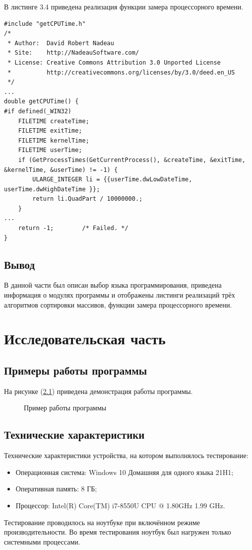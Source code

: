 \documentclass[12pt]{report}
\begin{document}
В листинге  3.4 приведена реализация функции замера процессорного времени.
\newpage
\begin{lstlisting}[label = some-code, caption = Функция замера процессорного времени]
#include "getCPUTime.h"
/*
 * Author:  David Robert Nadeau
 * Site:    http://NadeauSoftware.com/
 * License: Creative Commons Attribution 3.0 Unported License
 *          http://creativecommons.org/licenses/by/3.0/deed.en_US
 */
...
double getCPUTime() {
#if defined(_WIN32)
	FILETIME createTime;
	FILETIME exitTime;
	FILETIME kernelTime;
	FILETIME userTime;
	if (GetProcessTimes(GetCurrentProcess(), &createTime, &exitTime, &kernelTime, &userTime) != -1) {
		ULARGE_INTEGER li = {{userTime.dwLowDateTime, userTime.dwHighDateTime }};
        return li.QuadPart / 10000000.;
	}
...	
	return -1;        /* Failed. */
}
\end{lstlisting}

\section{Вывод}
В данной части был описан выбор языка программирования, приведена информация о модулях программы и отображены листинги реализаций трёх алгоритмов сортировки массивов, функции замера процессорного времени.

\chapter{Исследовательская часть}
\section{Примеры работы программы}
На рисунке (\ref{ris:example}) приведена демонстрация работы программы.

\begin{figure}[h]
\caption{Пример работы программы}
\label{ris:example}
\end{figure}

\section{Технические характеристики}
Технические характеристики устройства, на котором выполнялось тестирование:
\begin{itemize}
	\item Операционная система: Windows 10 Домашняя для одного языка 21H1;
	\item Оперативная память: 8 ГБ;
	\item Процессор: Intel(R) Core(TM) i7-8550U CPU @ 1.80GHz   1.99 GHz.
\end{itemize}
Тестирование проводилось на ноутбуке при включённом режиме производительности. Во время тестирования ноутбук был нагружен только системными процессами.
\end{document}
